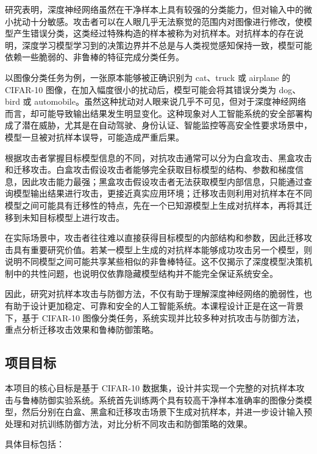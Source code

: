 \documentclass[UTF8,a4paper,12pt]{ctexart}
\begin{document}
研究表明，深度神经网络虽然在干净样本上具有较强的分类能力，但对输入中的微小扰动十分敏感。攻击者可以在人眼几乎无法察觉的范围内对图像进行修改，使模型产生错误分类，这类经过特殊构造的样本被称为对抗样本。对抗样本的存在说明，深度学习模型学习到的决策边界并不总是与人类视觉感知保持一致，模型可能依赖一些脆弱的、非鲁棒的特征完成分类任务。

以图像分类任务为例，一张原本能够被正确识别为 cat、truck 或 airplane 的 CIFAR-10 图像，在加入幅度很小的扰动后，模型可能会将其错误分类为 dog、bird 或 automobile。虽然这种扰动对人眼来说几乎不可见，但对于深度神经网络而言，却可能导致输出结果发生明显变化。这种现象对人工智能系统的安全部署构成了潜在威胁，尤其是在自动驾驶、身份认证、智能监控等高安全性要求场景中，模型一旦被对抗样本误导，可能造成严重后果。

根据攻击者掌握目标模型信息的不同，对抗攻击通常可以分为白盒攻击、黑盒攻击和迁移攻击。白盒攻击假设攻击者能够完全获取目标模型的结构、参数和梯度信息，因此攻击能力最强；黑盒攻击假设攻击者无法获取模型内部信息，只能通过查询模型输出结果进行攻击，更接近真实应用环境；迁移攻击则利用对抗样本在不同模型之间可能具有迁移性的特点，先在一个已知源模型上生成对抗样本，再将其迁移到未知目标模型上进行攻击。

在实际场景中，攻击者往往难以直接获得目标模型的内部结构和参数，因此迁移攻击具有重要研究价值。若某一模型上生成的对抗样本能够成功攻击另一个模型，则说明不同模型之间可能共享某些相似的非鲁棒特征。这不仅揭示了深度模型决策机制中的共性问题，也说明仅依靠隐藏模型结构并不能完全保证系统安全。

因此，研究对抗样本攻击与防御方法，不仅有助于理解深度神经网络的脆弱性，也有助于设计更加稳定、可靠和安全的人工智能系统。本课程设计正是在这一背景下，基于 CIFAR-10 图像分类任务，系统实现并比较多种对抗攻击与防御方法，重点分析迁移攻击效果和鲁棒防御策略。

\subsection{项目目标}

本项目的核心目标是基于 CIFAR-10 数据集，设计并实现一个完整的对抗样本攻击与鲁棒防御实验系统。系统首先训练两个具有较高干净样本准确率的图像分类模型，然后分别在白盒、黑盒和迁移攻击场景下生成对抗样本，并进一步设计输入预处理和对抗训练防御方法，对比分析不同攻击和防御策略的效果。

具体目标包括：
\end{document}
